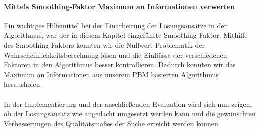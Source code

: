 \paragraph{Mittels Smoothing-Faktor Maximum an Informationen verwerten}
Ein wichtiges Hilfsmittel bei der Einarbeitung der Lösungsansätze in der Algorithmus, war der in diesem Kapitel eingeführte Smoothing-Faktor. Mithilfe des Smoothing-Faktors konnten wir die Nullwert-Problematik der Wahrscheinlichkeitsberechnung lösen und die Einflüsse der verschiedenen Faktoren in den Algorithmus besser kontrollieren. Dadurch konnten wir das Maximum an Informationen aus unserem PBM basierten Algorithmus herausholen. 
\\
\\
In der Implementierung und der anschließenden Evaluation wird sich nun zeigen, ob der Lösungsansatz wie angedacht umgesetzt werden kann und die gewünschten Verbesserungen des Qualitätsmaßes der Suche erreicht werden können.
